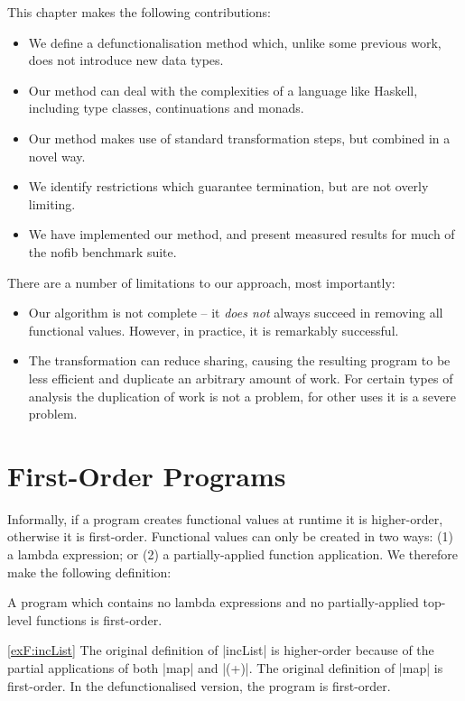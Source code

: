 This chapter makes the following contributions:

\begin{itemize}
\item We define a defunctionalisation method which, unlike some previous work, does not introduce new data types.
\item Our method can deal with the complexities of a language like Haskell, including type classes, continuations and monads.
\item Our method makes use of standard transformation steps, but combined in a novel way.
\item We identify restrictions which guarantee termination, but are not overly limiting.
\item We have implemented our method, and present measured results for much of the nofib benchmark suite.
\end{itemize}

There are a number of limitations to our approach, most importantly:

\begin{itemize}
\item Our algorithm is not complete -- it \textit{does not} always succeed in removing all functional values. However, in practice, it is remarkably successful.
\item The transformation can reduce sharing, causing the resulting program to be less efficient and duplicate an arbitrary amount of work. For certain types of analysis the duplication of work is not a problem, for other uses it is a severe problem.
\end{itemize}


\section{First-Order Programs}
\label{secF:first_order}

Informally, if a program creates functional values at runtime it is higher-order, otherwise it is first-order. Functional values can only be created in two ways: (1) a lambda expression; or (2) a partially-applied function application. We therefore make the following definition:

A program which contains no lambda expressions and no partially-applied top-level functions is first-order.

\begin{examplerevisit}{\ref{exF:incList}}
The original definition of |incList| is higher-order because of the partial applications of both |map| and |(+)|. The original definition of |map| is first-order. In the defunctionalised version, the program is first-order.
\end{examplerevisit}

